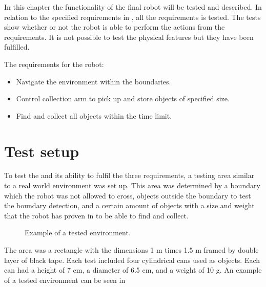 In this chapter the functionality of the final robot will be tested and described. In relation to the specified requirements in , all the requirements is tested. The tests show whether or not the robot is able to perform the actions from the requirements. It is not possible to test the physical features but they have been fulfilled.

The requirements for the robot: 
\begin{itemize}
\item Navigate the environment within the boundaries.
\item Control collection arm to pick up and store objects of specified size.
\item Find and collect all objects within the time limit.
\end{itemize}

\section{Test setup}
To test the \projname{} and its ability to fulfil the three requirements, a testing area similar to a real world environment was set up. This area was determined by a boundary which the robot was not allowed to cross, objects outside the boundary to test the boundary detection, and a certain amount of objects with a size and weight that the robot has proven in  to be able to find and collect.

\begin{figure}[H]
     \caption{\label{fig:test-setup} Example of a tested environment.}
\end{figure}

The area was a rectangle with the dimensions 1 m times 1.5 m framed by double layer of black tape. Each test included four cylindrical cans used as objects. Each can had a height of 7 cm, a diameter of 6.5 cm, and a weight of 10 g. An example of a tested environment can be seen in 

